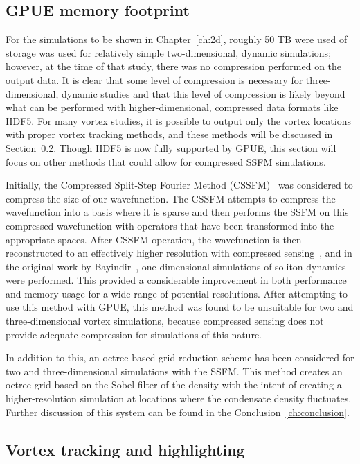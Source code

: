 \subsection{GPUE memory footprint}

For the simulations to be shown in Chapter~\ref{ch:2d}, roughly 50 TB were used of storage was used for relatively simple two-dimensional, dynamic simulations; however, at the time of that study, there was no compression performed on the output data.
It is clear that some level of compression is necessary for three-dimensional, dynamic studies and that this level of compression is likely beyond what can be performed with higher-dimensional, compressed data formats like HDF5.
For many vortex studies, it is possible to output only the vortex locations with proper vortex tracking methods, and these methods will be discussed in Section~\ref{sec:tracking}.
Though HDF5 is now fully supported by GPUE, this section will focus on other methods that could allow for compressed SSFM simulations.

Initially, the Compressed Split-Step Fourier Method (CSSFM)~\cite{bayindir2015} was considered to compress the size of our wavefunction.
The CSSFM attempts to compress the wavefunction into a basis where it is sparse and then performs the SSFM on this compressed wavefunction with operators that have been transformed into the appropriate spaces.
After CSSFM operation, the wavefunction is then reconstructed to an effectively higher resolution with compressed sensing~\cite{davenport2012}, and 
in the original work by Bayindir~\cite{bayindir2015}, one-dimensional simulations of soliton dynamics were performed.
This provided a considerable improvement in both performance and memory usage for a wide range of potential resolutions.
After attempting to use this method with GPUE, this method was found to be unsuitable for two and three-dimensional vortex simulations, because compressed sensing does not provide adequate compression for simulations of this nature.

In addition to this, an octree-based grid reduction scheme has been considered for two and three-dimensional simulations with the SSFM.
This method creates an octree grid based on the Sobel filter of the density with the intent of creating a higher-resolution simulation at locations where the condensate density fluctuates.
Further discussion of this system can be found in the Conclusion~\ref{ch:conclusion}.

\subsection{Vortex tracking and highlighting}
\label{sec:tracking}

